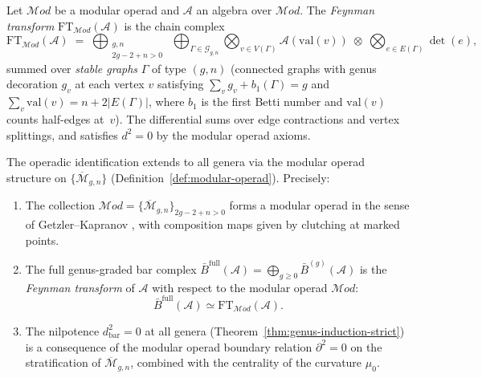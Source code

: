 \begin{definition}\label{def:feynman-transform}
Let $\mathcal{M}od$ be a modular operad and $\mathcal{A}$ an algebra
over $\mathcal{M}od$.  The \emph{Feynman transform}
$\mathrm{FT}_{\mathcal{M}od}(\mathcal{A})$
\cite[Definition~4.1]{GeK98} is the chain complex
\[
\mathrm{FT}_{\mathcal{M}od}(\mathcal{A})
\;=\;
\bigoplus_{\substack{g,n \\ 2g-2+n>0}}
\;\bigoplus_{\Gamma \in \mathcal{G}_{g,n}}
\bigotimes_{v \in V(\Gamma)} \mathcal{A}(\mathrm{val}(v))
\;\otimes\;
\bigotimes_{e \in E(\Gamma)} \det(e),
\]
summed over \emph{stable graphs} $\Gamma$ of type $(g,n)$
(connected graphs with genus decoration $g_v$ at each vertex $v$
satisfying $\sum_v g_v + b_1(\Gamma) = g$ and
$\sum_v \mathrm{val}(v) = n + 2|E(\Gamma)|$, where $b_1$ is the
first Betti number and $\mathrm{val}(v)$ counts half-edges at~$v$).
The differential sums over edge contractions and vertex splittings,
and satisfies $d^2 = 0$ by the modular operad axioms.
\end{definition}

\begin{theorem}\label{thm:prism-higher-genus}
The operadic identification extends to all genera via the
modular operad structure on $\{\overline{\mathcal{M}}_{g,n}\}$
(Definition~\ref{def:modular-operad}).
Precisely:
\begin{enumerate}[label=\textup{(\roman*)}]
\item The collection $\mathcal{M}od = \{\overline{\mathcal{M}}_{g,n}
  \}_{2g-2+n>0}$ forms a modular operad in the sense of
  Getzler--Kapranov \cite{GeK98}, with composition maps given by
  clutching at marked points.
\item The full genus-graded bar complex
  $\bar{B}^{\mathrm{full}}(\mathcal{A}) = \bigoplus_{g \geq 0}
  \bar{B}^{(g)}(\mathcal{A})$ is the \emph{Feynman transform}
  of $\mathcal{A}$ with respect to the modular operad
  $\mathcal{M}od$:
  \[
  \bar{B}^{\mathrm{full}}(\mathcal{A}) \simeq
  \mathrm{FT}_{\mathcal{M}od}(\mathcal{A}).
  \]
\item The nilpotence $d_{\mathrm{bar}}^2 = 0$ at all genera
  (Theorem~\ref{thm:genus-induction-strict}) is a consequence of the
  modular operad boundary relation $\partial^2 = 0$ on the
  stratification of $\overline{\mathcal{M}}_{g,n}$, combined with the
  centrality of the curvature $\mu_0$.
\end{enumerate}
\end{theorem}

